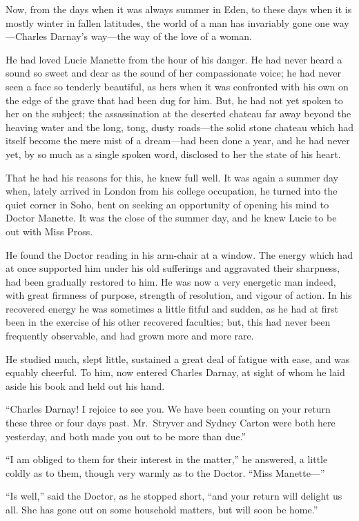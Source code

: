 Now, from the days when it was always summer in Eden, to these days
when it is mostly winter in fallen latitudes, the world of a man has
invariably gone one way---Charles Darnay's way---the way of the love of
a woman.

He had loved Lucie Manette from the hour of his danger.  He had never
heard a sound so sweet and dear as the sound of her compassionate
voice; he had never seen a face so tenderly beautiful, as hers when
it was confronted with his own on the edge of the grave that had been
dug for him.  But, he had not yet spoken to her on the subject;
the assassination at the deserted chateau far away beyond the heaving
water and the long, tong, dusty roads---the solid stone chateau which
had itself become the mere mist of a dream---had been done a year,
and he had never yet, by so much as a single spoken word, disclosed
to her the state of his heart.

That he had his reasons for this, he knew full well.  It was again a
summer day when, lately arrived in London from his college occupation,
he turned into the quiet corner in Soho, bent on seeking an opportunity
of opening his mind to Doctor Manette.  It was the close of the
summer day, and he knew Lucie to be out with Miss Pross.

He found the Doctor reading in his arm-chair at a window.  The energy
which had at once supported him under his old sufferings and aggravated
their sharpness, had been gradually restored to him.  He was now a
very energetic man indeed, with great firmness of purpose, strength
of resolution, and vigour of action.  In his recovered energy he was
sometimes a little fitful and sudden, as he had at first been in the
exercise of his other recovered faculties; but, this had never been
frequently observable, and had grown more and more rare.

He studied much, slept little, sustained a great deal of fatigue with
ease, and was equably cheerful.  To him, now entered Charles Darnay,
at sight of whom he laid aside his book and held out his hand.

``Charles Darnay!  I rejoice to see you.  We have been counting on your
return these three or four days past.  Mr.\ Stryver and Sydney Carton
were both here yesterday, and both made you out to be more than due.''

``I am obliged to them for their interest in the matter,'' he answered,
a little coldly as to them, though very warmly as to the Doctor.
``Miss Manette---''

``Is well,'' said the Doctor, as he stopped short, ``and your return
will delight us all.  She has gone out on some household matters,
but will soon be home.''


